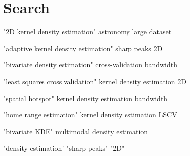 \section{Search}
\begin{itemizec}
    \item "2D kernel density estimation" astronomy large dataset
    \item "adaptive kernel density estimation" sharp peaks 2D
    \item "bivariate density estimation" cross-validation bandwidth
    \item "least squares cross validation" kernel density estimation 2D
    \item "spatial hotspot" kernel density estimation bandwidth
    \item "home range estimation" kernel density estimation LSCV
    \item "bivariate KDE" multimodal density estimation
    \item "density estimation" "sharp peaks" "2D"
\end{itemizec}
